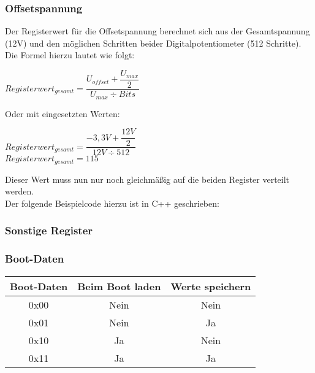\lstset{style=C}

\subsubsection*{Offsetspannung}
Der Registerwert für die Offsetspannung berechnet sich aus der Gesamtspannung (12V) und den möglichen Schritten beider Digitalpotentiometer (512 Schritte). Die Formel hierzu lautet wie folgt:\\
\begin{center}
$Registerwert_{gesamt} = \dfrac{U_{offset}+\dfrac{U_{max}}{2}}{U_{max}\div Bits}$\\
\end{center}
Oder mit eingesetzten Werten:
\begin{center}
$Registerwert_{gesamt} = \dfrac{-3,3V+\dfrac{12V}{2}}{12V\div 512}$\\
$Registerwert_{gesamt} = 115$\\
\end{center}
Dieser Wert muss nun nur noch gleichmäßig auf die beiden Register verteilt werden.\\
Der folgende Beispielcode hierzu ist in C++ geschrieben:\\
\lstset{style=C}

\subsubsection*{Sonstige Register}
\subsubsection*{Boot-Daten}

\begin{flushleft}
\begin{tabular}{c||c|c}
Boot-Daten & Beim Boot laden & Werte speichern\\
\hline
\hline
0x00 & Nein & Nein \\
\hline
0x01 & Nein & Ja\\
\hline
0x10 & Ja & Nein \\
\hline
0x11 & Ja & Ja \\
\end{tabular}
\end{flushleft}


